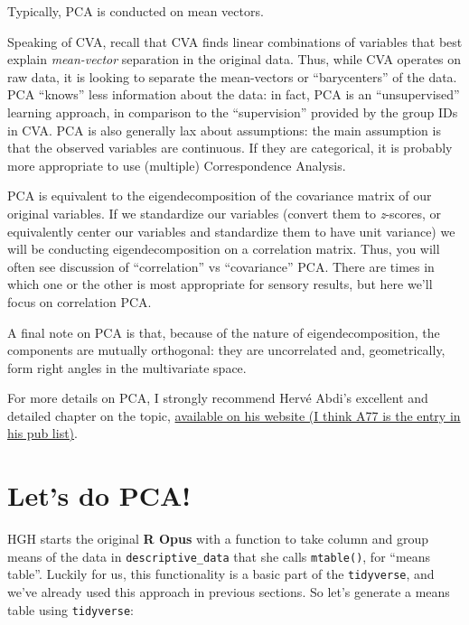 \documentclass[
]{book}
\begin{document}
Typically, PCA is conducted on mean vectors.

Speaking of CVA, recall that CVA finds linear combinations of variables that best explain \emph{mean-vector} separation in the original data. Thus, while CVA operates on raw data, it is looking to separate the mean-vectors or ``barycenters'' of the data. PCA ``knows'' less information about the data: in fact, PCA is an ``unsupervised'' learning approach, in comparison to the ``supervision'' provided by the group IDs in CVA. PCA is also generally lax about assumptions: the main assumption is that the observed variables are continuous. If they are categorical, it is probably more appropriate to use (multiple) Correspondence Analysis.

PCA is equivalent to the eigendecomposition of the covariance matrix of our original variables. If we standardize our variables (convert them to \emph{z}-scores, or equivalently center our variables and standardize them to have unit variance) we will be conducting eigendecomposition on a correlation matrix. Thus, you will often see discussion of ``correlation'' vs ``covariance'' PCA. There are times in which one or the other is most appropriate for sensory results, but here we'll focus on correlation PCA.

A final note on PCA is that, because of the nature of eigendecomposition, the components are mutually orthogonal: they are uncorrelated and, geometrically, form right angles in the multivariate space.

For more details on PCA, I strongly recommend Hervé Abdi's excellent and detailed chapter on the topic, \href{https://personal.utdallas.edu/~herve/}{available on his website (I think A77 is the entry in his pub list)}.

\section{Let's do PCA!}\label{lets-do-pca}

HGH starts the original \textbf{R Opus} with a function to take column and group means of the data in \texttt{descriptive\_data} that she calls \texttt{mtable()}, for ``means table''. Luckily for us, this functionality is a basic part of the \texttt{tidyverse}, and we've already used this approach in previous sections. So let's generate a means table using \texttt{tidyverse}:
\end{document}
